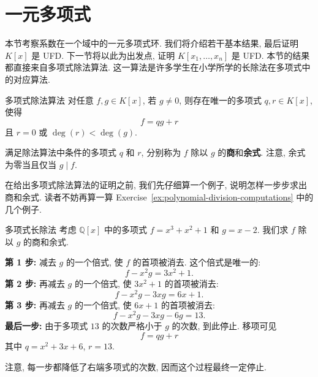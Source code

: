\section{一元多项式}\label{sec:single-variable-polynomials}

本节考察系数在一个域中的一元多项式环. 我们将介绍若干基本结果, 最后证明 $K[x]$ 是 UFD. 下一节将以此为出发点, 证明 $K[x_{1},\ldots,x_{n}]$ 是 UFD. 本节的结果都直接来自多项式除法算法. 这一算法是许多学生在小学所学的长除法在多项式中的对应算法.

\begin{Theorem}{多项式除法算法}\label{thm:polynomial-division}
  对任意 $f,g\in K[x]$, 若 $g\ne0$, 则存在唯一的多项式 $q,r\in K[x]$, 使得
  \[
    f=qg+r
  \]
  且 $r=0$ 或 $\deg(r)<\deg(g)$.
\end{Theorem}

满足除法算法中条件的多项式 $q$ 和 $r$, 分别称为 $f$ 除以 $g$ 的\textbf{商}和\textbf{余式}. 注意, 余式为零当且仅当 $g\mid f$.

在给出多项式除法算法的证明之前, 我们先仔细算一个例子, 说明怎样一步步求出商和余式. 读者不妨再算一算 Exercise~\ref{ex:polynomial-division-computations} 中的几个例子.

\begin{Example}{多项式长除法}\label{ex:polynomial-long-division}
  考虑 $\mathbb{Q}[x]$ 中的多项式 $f=x^{3}+x^{2}+1$ 和 $g=x-2$. 我们求 $f$ 除以 $g$ 的商和余式.

  \textbf{第 1 步:} 减去 $g$ 的一个倍式, 使 $f$ 的首项被消去. 这个倍式是唯一的:
  \[
    f-x^{2}g=3x^{2}+1.
  \]
  \textbf{第 2 步:} 再减去 $g$ 的一个倍式, 使 $3x^{2}+1$ 的首项被消去:
  \[
    f-x^{2}g-3xg=6x+1.
  \]
  \textbf{第 3 步:} 再减去 $g$ 的一个倍式, 使 $6x+1$ 的首项被消去:
  \[
    f-x^{2}g-3xg-6g=13.
  \]
  \textbf{最后一步:} 由于多项式 $13$ 的次数严格小于 $g$ 的次数, 到此停止. 移项可见
  \[
    f=qg+r
  \]
  其中 $q=x^{2}+3x+6$, $r=13$.

  注意, 每一步都降低了右端多项式的次数, 因而这个过程最终一定停止.
\end{Example}


